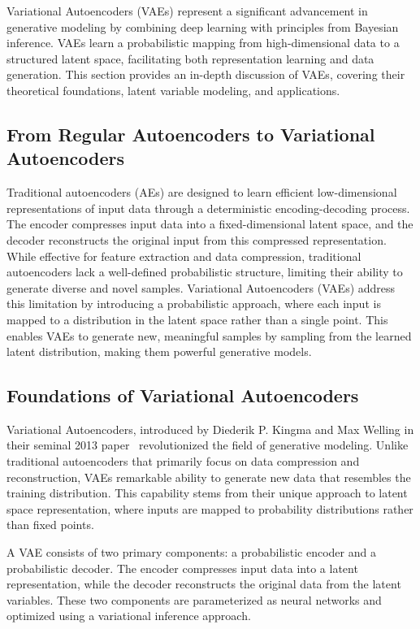 Variational Autoencoders (VAEs) represent a significant advancement in generative modeling by combining deep learning with principles from Bayesian inference. VAEs learn a probabilistic mapping from high-dimensional data to a structured latent space, facilitating both representation learning and data generation. This section provides an in-depth discussion of VAEs, covering their theoretical foundations, latent variable modeling, and applications.

\subsection{From Regular Autoencoders to Variational Autoencoders}
Traditional autoencoders (AEs) are designed to learn efficient low-dimensional representations of input data through a deterministic encoding-decoding process. The encoder compresses input data into a fixed-dimensional latent space, and the decoder reconstructs the original input from this compressed representation. While effective for feature extraction and data compression, traditional autoencoders lack a well-defined probabilistic structure, limiting their ability to generate diverse and novel samples. Variational Autoencoders (VAEs) address this limitation by introducing a probabilistic approach, where each input is mapped to a distribution in the latent space rather than a single point. This enables VAEs to generate new, meaningful samples by sampling from the learned latent distribution, making them powerful generative models.

\subsection{Foundations of Variational Autoencoders}
Variational Autoencoders, introduced by Diederik P. Kingma and Max Welling in their seminal 2013 paper~\cite{kingma2022autoencodingvariationalbayes} revolutionized the field of generative modeling. Unlike traditional autoencoders that primarily focus on data compression and reconstruction, VAEs remarkable ability to generate new data that resembles the training distribution. This capability stems from their unique approach to latent space representation, where inputs are mapped to probability distributions rather than fixed points. 

A VAE consists of two primary components: a probabilistic encoder and a probabilistic decoder. The encoder compresses input data into a latent representation, while the decoder reconstructs the original data from the latent variables. These two components are parameterized as neural networks and optimized using a variational inference approach.

